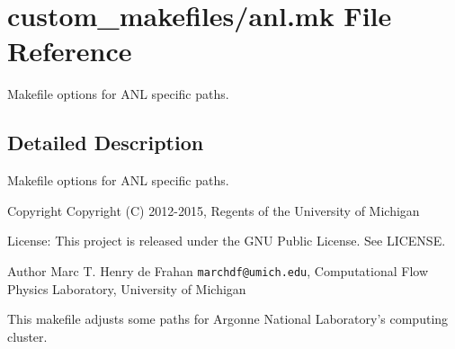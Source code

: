 \section{custom\-\_\-makefiles/anl.mk File Reference}
\label{anl_8mk}


Makefile options for A\-N\-L specific paths.  




\subsection{Detailed Description}
Makefile options for A\-N\-L specific paths. \begin{DoxyCopyright}{Copyright}
Copyright (C) 2012-\/2015, Regents of the University of Michigan 
\end{DoxyCopyright}
\begin{DoxyParagraph}{License\-:}
This project is released under the G\-N\-U Public License. See L\-I\-C\-E\-N\-S\-E. 
\end{DoxyParagraph}
\begin{DoxyAuthor}{Author}
Marc T. Henry de Frahan {\tt marchdf@umich.\-edu}, Computational Flow Physics Laboratory, University of Michigan
\end{DoxyAuthor}
This makefile adjusts some paths for Argonne National Laboratory's computing cluster. 